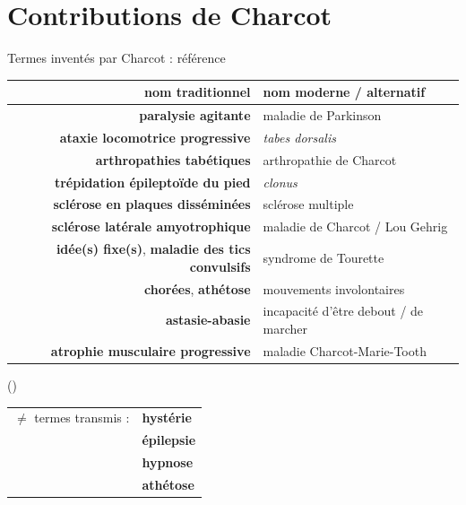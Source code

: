 \documentclass[xcolor={table,usenames,dvipsnames}]{beamer}
\newcommand{\bolder}[1]{{\color{purple}\bfseries#1}}
\let\oldfootnotesize\footnotesize
\renewcommand*{\footnotesize}{\oldfootnotesize\scriptsize}
\begin{document}
\section[Contributions de Charcot]{Contributions de Charcot}
\begin{frame}{Termes inventés par Charcot : référence}
	\begin{table}[h]
		\small
			\begin{tabular}{rl}
			nom traditionnel & nom moderne / alternatif \\
			\hline
			\bolder{paralysie agitante} & maladie de Parkinson\\
			\bolder{ataxie locomotrice progressive} & \textit{tabes dorsalis}\\
			\bolder{arthropathies tabétiques} & arthropathie de Charcot\\
			\bolder{trépidation épileptoïde du pied}  & \textit{clonus}\\
			\bolder{sclérose en plaques disséminées} & sclérose multiple\\
			\bolder{sclérose latérale amyotrophique} & maladie de Charcot / Lou Gehrig\\
			\bolder{idée(s) fixe(s)}, \bolder{maladie des tics convulsifs} & syndrome de Tourette\\
			\bolder{chorées}, \bolder{athétose}  &  mouvements involontaires	\\
			\bolder{astasie-abasie} & incapacité d'être debout / de marcher\\
			\bolder{atrophie musculaire progressive} & maladie Charcot-Marie-Tooth
		\end{tabular}
	\end{table}

	\begin{flushright}
		\scriptsize
		 (\citealp{walusinski,camargo2023}) 
	\end{flushright}
	\medskip
	\begin{flushright}
		\footnotesize
			\begin{tabular}{ll}
			$\neq$ termes transmis : & \textcolor{deepblue}{\textbf{hystérie}}\\ & \textcolor{deepblue}{\textbf{épilepsie}} \\ & \textcolor{deepblue}{\textbf{hypnose}}\\
			& \textcolor{deepblue}{\textbf{athétose}}
		\end{tabular}

	\end{flushright}


\end{frame}
\end{document}
